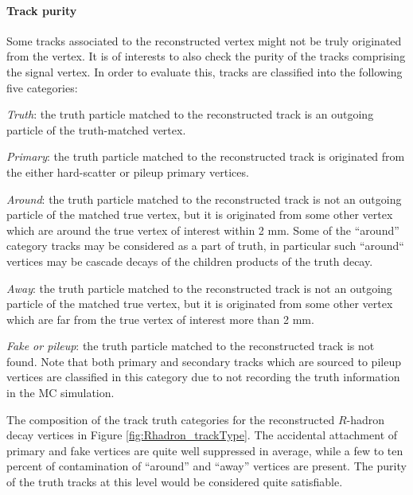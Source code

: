 \paragraph{Track purity}
Some tracks associated to the reconstructed vertex might not be truly originated from the vertex. It is of interests to also check the purity of the tracks comprising the signal vertex. In order to evaluate this, tracks are classified into the following five categories:
\begin{description}
\item {\emph{Truth}}: the truth particle matched to the reconstructed track is an outgoing particle of the truth-matched vertex.
\item {\emph{Primary}}: the truth particle matched to the reconstructed track is originated from the either hard-scatter or pileup primary vertices.
\item {\emph{Around}}: the truth particle matched to the reconstructed track is not an outgoing particle of the matched true vertex, but it is originated from some other vertex which are around the true vertex of interest within 2 mm. Some of the ``around'' category tracks may be considered as a part of truth, in particular such ``around`` vertices may be cascade decays of the children products of the truth decay.
\item {\emph{Away}}: the truth particle matched to the reconstructed track is not an outgoing particle of the matched true vertex, but it is originated from some other vertex which are far from the true vertex of interest more than 2 mm.
\item {\emph{Fake or pileup}}: the truth particle matched to the reconstructed track is not found. Note that both primary and secondary tracks which are sourced to pileup vertices are classified in this category due to not recording the truth information in the MC simulation.
\end{description}

The composition of the track truth categories for the reconstructed $R$-hadron decay vertices in Figure \ref{fig:Rhadron_trackType}. The accidental attachment of primary and fake vertices are quite well suppressed in average, while a few to ten percent of contamination of ``around'' and ``away'' vertices are present. The purity of the truth tracks at this level would be considered quite satisfiable.

